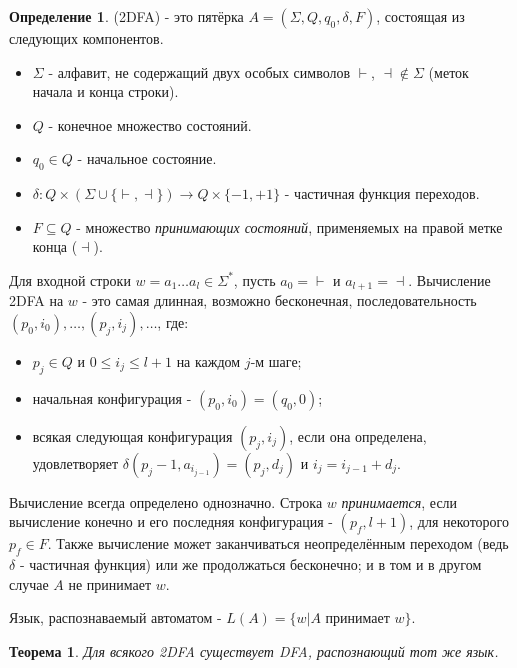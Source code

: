 \documentclass[a4paper]{article}
\theoremstyle{indented}
\newtheorem{theorem}{Теорема}
\theoremstyle{definition}
\newtheorem{defn}{Определение}
\theoremstyle{remark}
\DeclareMathOperator{\ra}{\rightarrow}
\begin{document}
\begin{defn}
     (2DFA) - это пятёрка $A = (\Sigma, Q, q_0 , \delta, F )$, состоящая из следующих компонентов.

    \begin{itemize}
        \item $\Sigma$ - алфавит, не содержащий двух особых символов $\vdash$, $\dashv \notin \Sigma$ (меток начала и конца строки).
        \item $Q$ - конечное множество состояний.
        \item $q_0 \in Q$ - начальное состояние.
        \item $\delta:Q\times(\Sigma \cup\{\vdash,\dashv\})\ra Q\times\{-1,+1\}$ - частичная функция переходов.
        \item $F \subseteq Q$ - множество \textit{принимающих состояний}, применяемых на правой метке конца ($\dashv$).
    \end{itemize}

    Для входной строки $w = a_1 \ldots a_l \in \Sigma^*$, пусть $a_0 = \vdash$ и $a_{l+1} = \dashv$. Вычисление 2DFA на $w$ - это самая длинная, возможно бесконечная, последовательность $(p_0,i_0),\ldots,(p_j,i_j),\ldots$, где:

    \begin{itemize}
        \item $p_j \in Q$ и $0 \leq i_j \leq l+1$ на каждом $j$-м шаге;
        \item начальная конфигурация - $(p_0, i_0) = (q_0, 0)$;
        \item всякая следующая конфигурация $(p_j , i_j )$, если она определена, удовлетворяет $\delta(p_j-1,a_{i_{j-1}})=(p_j,d_j)$ и $i_j =i_{j-1}+d_j$.
    \end{itemize}

    Вычисление всегда определено однозначно. Строка $w$ \textit{принимается}, если вычисление конечно и его последняя конфигурация - $(p_f,l+1)$, для некоторого $p_f \in F$. Также вычисление может заканчиваться неопределённым переходом (ведь $\delta$ - частичная функция) или же продолжаться бесконечно; и в том и в другом случае $A$ не принимает $w$.

    Язык, распознаваемый автоматом - $L(A) = \{ w | A \text{ принимает } w \}$.
\end{defn}

\begin{theorem}
    Для всякого 2DFA существует DFA, распознающий тот же язык.
\end{theorem} \ 
\end{document}
